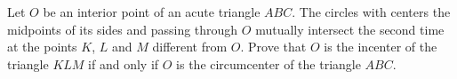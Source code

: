 Let $O$ be an interior point of an acute triangle $ABC$. The circles with centers the midpoints of its sides and passing through $O$ mutually intersect the second time at the points $K$,  $L$ and $M$ different from $O$. Prove that $O$ is the incenter of the triangle $KLM$ if and only if $O$ is the circumcenter of the triangle $ABC$.